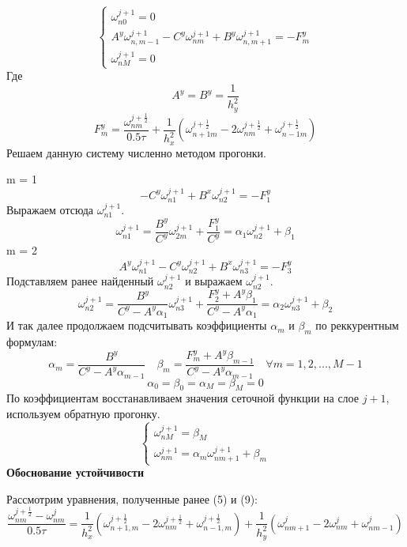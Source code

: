 \documentclass{article}
\begin{document}
\begin{equation}
    \begin{cases}
    \omega_{n0}^{j+1} = 0\\
    A^y \omega_{n,m-1}^{j+1} -  C^y \omega_{nm}^{j+1} + B^y \omega_{n,m+1}^{j+1}  = -F^y_m\\
    \omega_{nM}^{j+1} = 0 
    \end{cases}
\end{equation}
Где 
$$
A^y = B^y = \frac{1}{h_y^2}
$$
$$
F^y_m = \frac{\omega_{n m }^{j+\frac{1}{2}}}{0.5\tau} + \frac{1}{h_x^2}\left(\omega_{n+1 m }^{j+\frac{1}{2}} -2\omega_{n m }^{j+\frac{1}{2}} + \omega_{n-1 m }^{j+\frac{1}{2}}   \right)
$$
Решаем данную систему численно методом прогонки.




m = 1
$$
-C^y\omega_{n1}^{j+1} + B^x \omega_{n2}^{j+1} = - F_1^y 
$$
Выражаем отсюда $\omega_{n1}^{j+1}$.
$$
\omega_{n1}^{j+1}  = \frac{B^y}{C^y} \omega_{2m}^{j+1} + \frac{F_1^y}{C^y} =  \alpha_1 \omega_{n2}^{j+1} + \beta_1
$$
m = 2
$$
A^y\omega_{n1}^{j+1} -C^y\omega_{n2}^{j+1} + B^x \omega_{n3}^{j+1} = - F_3^y
$$
Подставляем ранее найденный $\omega_{n2}^{j+1}$ и выражаем $\omega_{n2}^{j+1}$.
$$
\omega_{n2}^{j+1} = \frac{B^y}{C^y - A^y\alpha_1} \omega_{n3}^{j+1} + \frac{F^y_2 + A^y\beta_1}{C^y - A^y\alpha_1} = \alpha_2 \omega_{n3}^{j+1} + \beta_2
$$
И так далее продолжаем подсчитывать коэффициенты $\alpha_m$ и $\beta_m$ по реккурентным формулам:
$$
\alpha_m = \frac{B^y}{C^y - A^y\alpha_{m-1}}\quad\beta_m = \frac{F_m^y + A^y \beta_{m-1}}{C^y - A^y\alpha_{m-1}}\quad \forall m = 1,2,...,M-1
$$
$$
\alpha_0 = \beta_0 = \alpha_M = \beta_M =0
$$
По коэффициентам восстанавливаем значения сеточной функции на слое $j + 1$, используем обратную прогонку. 
\begin{equation}
\begin{cases}
\omega_{nM}^{j+1} = \beta_M\\
\omega_{nm}^{j+1} = \alpha_m \omega_{nm+1}^{j+1} + \beta_m
\end{cases}
\end{equation}
\textbf{Обоснование устойчивости}



Рассмотрим уравнения, полученные ранее (5) и (9):
$$
\frac{\omega_{nm}^{j+\frac{1}{2}} - \omega^j_{nm}}{0.5\tau} = \frac{1}{h_x^2}\left(
    \omega_{n+1,m}^{j+\frac{1}{2}} - 2 \omega_{nm}^{j+\frac{1}{2}} + \omega_{n-1,m}^{j+\frac{1}{2}}
    \right)
    +
    \frac{1}{h_y^2}\left(
    \omega^j_{nm+1} - 2\omega_{nm}^{j} + \omega_{nm-1}^{j}
    \right)
$$
\end{document}
